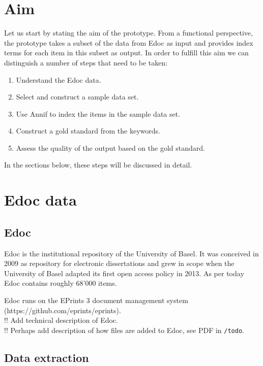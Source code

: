 \hypertarget{aim}{%
\section{Aim}\label{aim}}

Let us start by stating the aim of the prototype. From a functional
perspective, the prototype takes a subset of the data from Edoc as input
and provides index terms for each item in this subset as output. In
order to fulfill this aim we can distinguish a number of steps that need
to be taken:

\begin{enumerate}
\def\labelenumi{\arabic{enumi}.}
\tightlist
\item
  Understand the Edoc data.\\
\item
  Select and construct a sample data set.
\item
  Use Annif to index the items in the sample data set.
\item
  Construct a gold standard from the keywords.
\item
  Assess the quality of the output based on the gold standard.
\end{enumerate}

In the sections below, these steps will be discussed in detail.

\hypertarget{edoc-data}{%
\section{Edoc data}\label{edoc-data}}

\hypertarget{edoc}{%
\subsection{Edoc}\label{edoc}}

Edoc is the institutional repository of the University of Basel. It was
conceived in 2009 as repository for electronic dissertations and grew in
scope when the University of Basel adapted its first open access policy
in 2013. As per today Edoc contains roughly 68'000 items.

Edoc runs on the EPrints 3 document management system
(https://github.com/eprints/eprints).\\
!! Add technical description of Edoc.\\
!! Perhaps add description of how files are added to Edoc, see PDF in
\texttt{/todo}.

\hypertarget{data-extraction}{%
\subsection{Data extraction}\label{data-extraction}}

